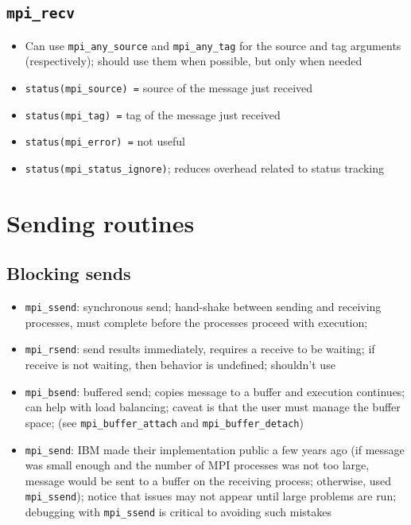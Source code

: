 \documentclass[10pt]{article}
\newenvironment{mitemize}
{
  \begin{itemize}
  \setlength{\itemsep}{1pt}
  \setlength{\parskip}{0pt}
  \setlength{\parsep}{0pt}}{\end{itemize}
}
\begin{document}
\subsection{\texttt{mpi\_recv}}
\begin{mitemize}
  \item Can use \texttt{mpi\_any\_source} and \texttt{mpi\_any\_tag} for the source and tag arguments (respectively); should use them when possible, but only when needed
  \item \texttt{status(mpi\_source) =} source of the message just received
  \item \texttt{status(mpi\_tag) =} tag of the message just received
  \item \texttt{status(mpi\_error) =} not useful
  \item \texttt{status(mpi\_status\_ignore)}; reduces overhead related to status tracking
\end{mitemize}


\section{Sending routines}

\subsection{Blocking sends}
\begin{mitemize}
  \item \texttt{mpi\_ssend}: synchronous send; hand-shake between sending and receiving processes, must complete before the processes proceed with execution;
  \item \texttt{mpi\_rsend}: send results immediately, requires a receive to be waiting; if receive is not waiting, then behavior is undefined; shouldn't use
  \item \texttt{mpi\_bsend}: buffered send; copies message to a buffer and execution continues; can help with load balancing; caveat is that the user must manage the buffer space; (see \texttt{mpi\_buffer\_attach} and \texttt{mpi\_buffer\_detach})
  \item \texttt{mpi\_send}: IBM made their implementation public a few years ago (if message was small enough and the number of MPI processes was not too large, message would be sent to a buffer on the receiving process; otherwise, used \texttt{mpi\_ssend}); notice that issues may not appear until large problems are run; debugging with \texttt{mpi\_ssend} is critical to avoiding such mistakes
\end{mitemize}
\end{document}
